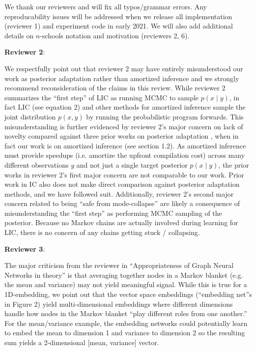 \documentclass{article}
\begin{document}
We thank our reviewers and will fix all typos/grammar errors. Any
reproducability issues will be addressed when we release all implementation
(reviewer 1) and experiment code in early 2021. We will also add additional
details on $n$-schools notation and motivation (reviewers 2, 6).

\textbf{Reviewer 2}:

We respectfully point out that reviewer 2 may have entirely misunderstood our work as
posterior adaptation rather than amortized inference and we strongly recommend
reconsideration of the claims in this review.
While reviewer 2 summarizes the ``first step'' of LIC as running
MCMC to sample $p(x \mid y)$, in fact LIC (see equation 2) and other methods
for amortized inference \cite{le2017inference} sample the joint distribution
$p(x,y)$ by running the probabilistic program forwards. This misunderstanding
is further evidenced by reviewer 2's major concern on lack of novelty
compared against three prior works on posterior adaptation
\cite{de2001variational,neklyudov2018metropolis,titsias2019gradient}, when in
fact our work is on amortized inference (see section 1.2). As amortized
inference must provide speedups (i.e. amortize the upfront compilation
cost) across many different observations $y$ and not just a single target
posterior $p(x \mid y)$, the prior works in reviewer 2's first major concern
are not comparable to our work. Prior work in IC \cite{le2017inference} also
does not make direct comparison against posterior adaptation methods, and we have
followed suit.
Additionally, reviewer 2's second major concern related to being ``safe from
mode-collapse'' are likely a consequence of misunderstanding the ``first
step'' as performing MCMC sampling of the posterior. Because no Markov chains
are actually involved during learning for LIC, there is no concern of any chains getting stuck
/ collapsing.

\textbf{Reviewer 3}:

The major criticism from the reviewer in ``Appropriateness of Graph Neural Networks in theory''
is that averaging together nodes in a Markov blanket (e.g. the mean and variance) may
not yield meaningful signal. While this is true for a 1D-embedding, we point out that
the vector space embeddings (``embedding net''s in Figure 2) yield multi-dimensional
embeddings where different dimensions handle how nodes in the Markov blanket ``play
different roles from one another.'' For the mean/variance example, the
embedding networks could potentially learn to embed the mean to dimension 1
and variance to dimension 2 so the resulting sum yields a 2-dimensional
[mean, variance] vector.
\end{document}
